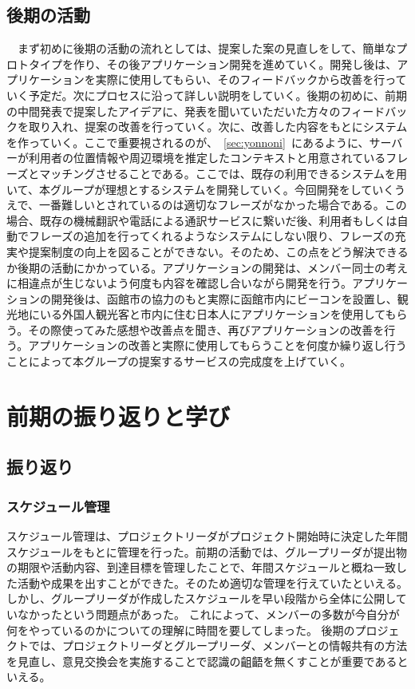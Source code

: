 \documentclass[openany,11pt,papersize]{jsbook}
\begin{document}
\section{後期の活動}
　まず初めに後期の活動の流れとしては、提案した案の見直しをして、簡単なプロトタイプを作り、その後アプリケーション開発を進めていく。開発し後は、アプリケーションを実際に使用してもらい、そのフィードバックから改善を行っていく予定だ。次にプロセスに沿って詳しい説明をしていく。後期の初めに、前期の中間発表で提案したアイデアに、発表を聞いていただいた方々のフィードバックを取り入れ、提案の改善を行っていく。次に、改善した内容をもとにシステムを作っていく。ここで重要視されるのが、~\ref{sec:yonnoni}~にあるように、サーバーが利用者の位置情報や周辺環境を推定したコンテキストと用意されているフレーズとマッチングさせることである。ここでは、既存の利用できるシステムを用いて、本グループが理想とするシステムを開発していく。今回開発をしていくうえで、一番難しいとされているのは適切なフレーズがなかった場合である。この場合、既存の機械翻訳や電話による通訳サービスに繋いだ後、利用者もしくは自動でフレーズの追加を行ってくれるようなシステムにしない限り、フレーズの充実や提案制度の向上を図ることができない。そのため、この点をどう解決できるか後期の活動にかかっている。アプリケーションの開発は、メンバー同士の考えに相違点が生じないよう何度も内容を確認し合いながら開発を行う。アプリケーションの開発後は、函館市の協力のもと実際に函館市内にビーコンを設置し、観光地にいる外国人観光客と市内に住む日本人にアプリケーションを使用してもらう。その際使ってみた感想や改善点を聞き、再びアプリケーションの改善を行う。アプリケーションの改善と実際に使用してもらうことを何度か繰り返し行うことによって本グループの提案するサービスの完成度を上げていく。


\chapter{前期の振り返りと学び}

\section{振り返り}

\subsection{スケジュール管理}
スケジュール管理は、プロジェクトリーダがプロジェクト開始時に決定した年間スケジュールをもとに管理を行った。前期の活動では、グループリーダが提出物の期限や活動内容、到達目標を管理したことで、年間スケジュールと概ね一致した活動や成果を出すことができた。そのため適切な管理を行えていたといえる。
しかし、グループリーダが作成したスケジュールを早い段階から全体に公開していなかったという問題点があった。
これによって、メンバーの多数が今自分が何をやっているのかについての理解に時間を要してしまった。
後期のプロジェクトでは、プロジェクトリーダとグループリーダ、メンバーとの情報共有の方法を見直し、意見交換会を実施することで認識の齟齬を無くすことが重要であるといえる。
\end{document}

